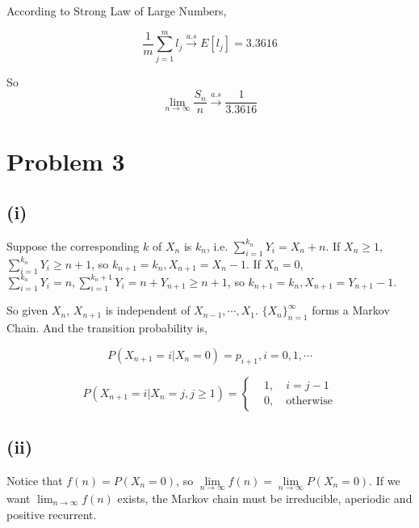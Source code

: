 \documentclass{article}
\begin{document}
According to Strong Law of Large Numbers,

\begin{equation}
    \frac{1}{m} \sum_{j=1}^m l_j \overset{a.s}{\longrightarrow} E[l_j] = 3.3616 
\end{equation}

So \begin{equation}
    \lim_{n\to \infty} \frac{S_n}{ n } \overset{a.s}{\longrightarrow} \frac{1}{3.3616}
\end{equation}


\section{Problem 3}

\subsection{(i)}
Suppose the corresponding $k$ of $X_n$ is $k_n$, i.e. $\sum_{i=1}^{k_n} Y_i = X_n+n$.
If $X_n \geqslant 1$, $\sum_{i=1}^{k_n}  Y_i \geqslant n+1$, so $k_{n+1} = k_n,X_{n+1} = X_n -1$.
If $X_n = 0$, $\sum_{i=1}^{k_n} Y_i= n,  \sum_{i=1}^{k_n+1} Y_i= n+Y_{n+1} \geqslant n+1$, so $k_{n+1} = k_n,X_{n+1} = Y_{n+1}-1$.
 
So given $X_{n}$, $X_{n+1}$ is independent of $X_{n-1},\cdots,X_1$. $\{X_n\}_{n=1}^{\infty}$ forms a Markov Chain. And the transition probability is,

\begin{equation}
    P(X_{n+1} = i | X_{n} = 0) = p_{i+1}, i =0,1,\cdots
\end{equation}

\begin{equation}
    P(X_{n+1} = i | X_{n} = j,j\geqslant 1) =  \left\{ \begin{aligned}
        &1, \quad i=j-1 \\
        &0, \quad\text{otherwise}
    \end{aligned}
        \right.
\end{equation}

\subsection{(ii)}

Notice that $f(n) = P(X_n =0)$, so $\lim\limits_{n\to\infty} f(n) = \lim\limits_{n\to\infty} P(X_n =0)$. If we want $\lim_{n \to \infty} f(n)$ exists, the Markov chain must be irreducible, aperiodic and positive recurrent.
\end{document}
